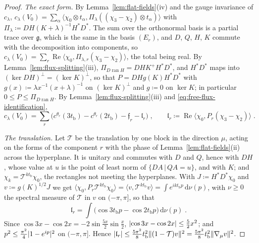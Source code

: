 \documentclass[11pt]{preprint}
\newcommand{\dd}{\mathrm{d}}
\DeclarePairedDelimiter{\abs}{\lvert}{\rvert}
\DeclarePairedDelimiter{\norm}{\lVert}{\rVert}
\numberwithin{equation}{section}
\theoremstyle{definition}
\theoremstyle{remark}
\theoremstyle{plain}
\begin{document}
\begin{proof}
\emph{The exact form.} By Lemma~\ref{lem:flat-fields}(iv) and the gauge invariance of $c_\lambda$, $c_\lambda(V_0) = \sum_\alpha\langle\chi_0 \otimes t_\alpha, \Pi_\lambda((\chi_3 - \chi_2) \otimes t_\alpha)\rangle$ with $\Pi_\lambda \coloneqq DH(K + \lambda)^{-1}H^*D^*$. The sum over the orthonormal basis is a partial trace over $\mathfrak g$, which is the same in the basis $(E_r)$, and $D$, $Q$, $H$, $K$ commute with the decomposition into components, so $c_\lambda(V_0) = \sum_r\operatorname{Re}\langle\chi_0, \Pi_{\lambda,r}(\chi_3 - \chi_2)\rangle$, the total being real. By Lemma~\ref{lem:flux-splitting}(iii), $\Pi_{D\operatorname{ran}H} = DHK^+H^*D^*$, and $H^*D^*$ maps into $(\ker DH)^\perp = (\ker K)^\perp$, so that $P = DHg(K)H^*D^*$ with $g(x) \coloneqq \lambda x^{-1}(x + \lambda)^{-1}$ on $(\ker K)^\perp$ and $g \coloneqq 0$ on $\ker K$; in particular $0 \leq P \leq \Pi_{D\operatorname{ran}H}$. By Lemma~\ref{lem:flux-splitting}(iii) and \eqref{eq:free-flux-identification},
\begin{equation}\label{eq:flat-decomposition}
    c_\lambda(V_0) = \sum_r\bigl(c^{\theta_r}(3t_{\mathrm b}) - c^{\theta_r}(2t_{\mathrm b}) - \mathfrak f_r - \mathfrak l_r\bigr)\;,
    \qquad
    \mathfrak l_r \coloneqq \operatorname{Re}\bigl\langle\chi_0, P_r(\chi_3 - \chi_2)\bigr\rangle\;.
\end{equation}

\emph{The translation.} Let $\mathcal T$ be the translation by one block in the direction $\mu$, acting on the forms of the component $r$ with the phase of Lemma~\ref{lem:flat-fields}(ii) across the hyperplane. It is unitary and commutes with $D$ and $Q$, hence with $DH$, whose value at $u$ is the point of least norm of $\{ DA \,|\, QA = u \}$, and with $K$; and $\chi_k = \mathcal T^{kt_{\mathrm b}}\chi_0$, the rectangles not meeting the hyperplanes. With $J \coloneqq H^*D^*\chi_0$ and $v \coloneqq g(K)^{1/2}J$ we get $\langle\chi_0, P_r\mathcal T^{kt_{\mathrm b}}\chi_0\rangle = \langle v, \mathcal T^{kt_{\mathrm b}}v\rangle = \int e^{ikt_{\mathrm b}p}\,\dd\nu(p)$, with $\nu \geq 0$ the spectral measure of $\mathcal T$ in $v$ on $(-\pi, \pi]$, so that
\begin{equation}\label{eq:lambda-spectral}
    \mathfrak l_r = \int\bigl(\cos3t_{\mathrm b}p - \cos2t_{\mathrm b}p\bigr)\,\dd\nu(p)\;.
\end{equation}
Since $\cos3x - \cos2x = -2\sin\frac{5x}2\sin\frac x2$, $\abs{\cos3x - \cos2x} \leq \frac52x^2$; and $p^2 \leq \frac{\pi^2}4\abs{1 - e^{ip}}^2$ on $(-\pi, \pi]$. Hence $\abs{\mathfrak l_r} \leq \frac{5\pi^2}8t_{\mathrm b}^2\norm{(1 - \mathcal T)v}^2 = \frac{5\pi^2}8t_{\mathrm b}^2\norm{\nabla_\mu v}^2$.


\end{proof}
\end{document}
